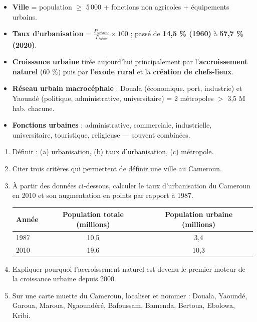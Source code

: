 \documentclass[11pt]{article}
\begin{document}
\begin{aretenir}
\begin{itemize}
\item \textbf{Ville} = population $\ge$ 5\,000 + fonctions non agricoles + équipements urbains.
\item \textbf{Taux d'urbanisation} = $\frac{P_{urbaine}}{P_{totale}} \times 100$ ; passé de \textbf{14,5 \% (1960)} à \textbf{57,7 \% (2020)}.
\item \textbf{Croissance urbaine} tirée aujourd'hui principalement par l'\textbf{accroissement naturel} (60 \%) puis par l'\textbf{exode rural} et la \textbf{création de chefs-lieux}.
\item \textbf{Réseau urbain macrocéphale} : Douala (économique, port, industrie) et Yaoundé (politique, administrative, universitaire) = 2 métropoles $>$ 3,5 M hab. chacune.
\item \textbf{Fonctions urbaines} : administrative, commerciale, industrielle, universitaire, touristique, religieuse — souvent combinées.
\end{itemize}
\end{aretenir}

\begin{exercice}
\begin{enumerate}
\item Définir : (a) urbanisation, (b) taux d'urbanisation, (c) métropole.
\item Citer trois critères qui permettent de définir une ville au Cameroun.
\item À partir des données ci-dessous, calculer le taux d'urbanisation du Cameroun en 2010 et son augmentation en points par rapport à 1987.
      \begin{center}
      \begin{tabular}{|l|c|c|}\hline
      Année & Population totale (millions) & Population urbaine (millions) \\ \hline
      1987 & 10,5 & 3,4 \\
      2010 & 19,6 & 10,3 \\ \hline
      \end{tabular}
      \end{center}
\item Expliquer pourquoi l'accroissement naturel est devenu le premier moteur de la croissance urbaine depuis 2000.
\item Sur une carte muette du Cameroun, localiser et nommer : Douala, Yaoundé, Garoua, Maroua, Ngaoundéré, Bafoussam, Bamenda, Bertoua, Ebolowa, Kribi.
\end{enumerate}
\end{exercice}
\end{document}
